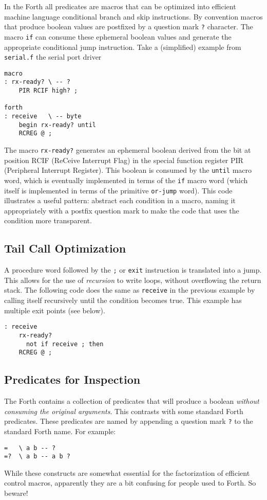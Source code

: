 \documentclass[12pt]{article}
\begin{document}
In the Forth all predicates are macros that can be optimized into
efficient machine language conditional branch and skip
instructions. By convention macros that produce boolean values are
postfixed by a question mark \verb|?| character. The macro \verb|if| can
consume these ephemeral boolean values and generate the appropriate
conditional jump instruction. Take a (simplified) example from
\verb|serial.f| the serial port driver
\begin{verbatim}
macro
: rx-ready? \ -- ?
    PIR RCIF high? ;

forth
: receive   \ -- byte
    begin rx-ready? until
    RCREG @ ;
\end{verbatim}
The macro \verb|rx-ready?| generates an ephemeral boolean derived from
the bit at position RCIF (ReCeive Interrupt Flag) in the special
function register PIR (Peripheral Interrupt Register).  This boolean
is consumed by the \verb|until| macro word, which is eventually
implemented in terms of the \verb|if| macro word (which itself is
implemented in terms of the primitive \verb|or-jump| word). This code
illustrates a useful pattern: abstract each condition in a macro,
naming it appropriately with a postfix question mark to make the code
that uses the condition more transparent.

\subsection{Tail Call Optimization}

A procedure word followed by the \verb|;| or \verb|exit| instruction
is translated into a jump. This allows for the use of \emph{recursion}
to write loops, without overflowing the return stack. The following
code does the same as \verb|receive| in the previous example by
calling itself recursively until the condition becomes true. This
example has multiple exit points (see below).
\begin{verbatim}
: receive
    rx-ready? 
      not if receive ; then
    RCREG @ ;
\end{verbatim}


\subsection{Predicates for Inspection}


The Forth contains a collection of predicates that will produce a
boolean \emph{without consuming the original arguments}. This
contrasts with some standard Forth predicates. These predicates are
named by appending a question mark \verb|?| to the standard Forth
name. For example:
\begin{verbatim}
=   \ a b -- ?
=?  \ a b -- a b ?
\end{verbatim}
While these constructs are somewhat essential for the factorization of
efficient control macros, apparently they are a bit confusing for
people used to Forth. So beware!
\end{document}
